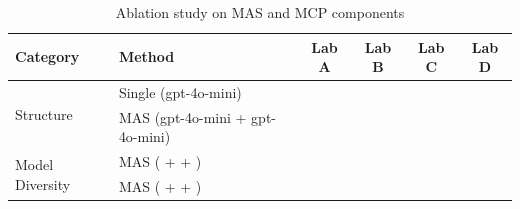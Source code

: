 


\begin{table}[t]
\centering
\caption{Ablation study on MAS and MCP components}
\label{tab:ablation}
\begin{tabular}{llcccc}
\toprule
Category & Method & Lab A & Lab B & Lab C & Lab D \\
\midrule

\multirow{2}{*}{Structure}
& Single (gpt-4o-mini) &  &  &  &  \\
& MAS (gpt-4o-mini + gpt-4o-mini) &  &  &  &  \\

\midrule

\multirow{2}{*}{Model Diversity}
& MAS (  +  +  ) &  &  &  &  \\
& MAS (  +  +  ) &  &  &  &  \\

\midrule


\bottomrule
\end{tabular}
\end{table}